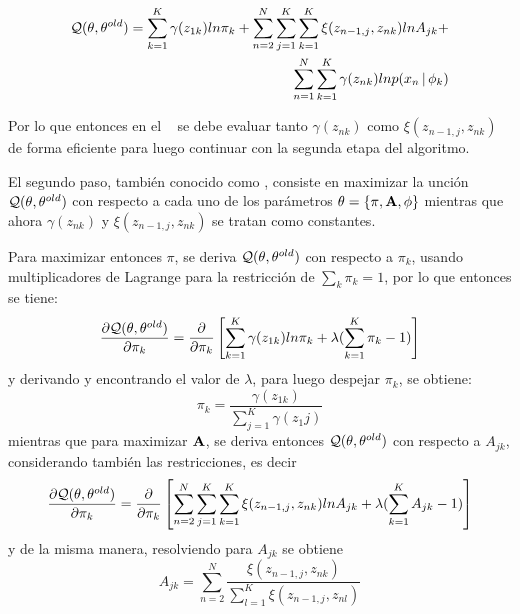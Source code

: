 \begin{equation}
\begin{split}
\mathcal{Q}(\theta, \theta^{old}) = 
  \sum_{k=1}^K \gamma(z_{1k}) ln \pi_k + 
  \sum_{n=2}^N \sum_{j=1}^K \sum_{k=1}^K \xi(z_{n-1,j}, z_{nk}) ln A_{jk} + \\
  \sum_{n=1}^N \sum_{k=1}^K \gamma(z_{nk}) ln p(x_n \,|\, \phi_k)
\label{eqn:3-7}
\end{split}
\end{equation}

Por lo que entonces en el \estep~ se debe evaluar tanto $\gamma(z_{nk})$ como $\xi(z_{n-1,j}, z_{nk})$ de forma eficiente para luego continuar con la segunda etapa del algoritmo.

El segundo paso, también conocido como \mstep, consiste en maximizar la unción $\mathcal{Q}(\theta, \theta^{old})$ con respecto a cada uno de los parámetros $\theta = \lbrace \pi, \textbf{A}, \phi \rbrace$ mientras que ahora $\gamma(z_{nk})$ y $\xi(z_{n-1,j}, z_{nk})$ se tratan como constantes.

Para maximizar entonces $\pi$, se deriva $\mathcal{Q}(\theta, \theta^{old})$ con respecto a $\pi_k$, usando multiplicadores de Lagrange para la restricción de $\sum_k \pi_k = 1$, por lo que entonces se tiene: 
\begin{equation*}
  \frac {\partial \mathcal{Q}(\theta, \theta^{old})}{\partial \pi_k} = 
  \frac {\partial}{\partial \pi_k} 
  \left[
    \sum_{k=1}^K \gamma(z_{1k}) ln \pi_k + \lambda (\sum_{k=1}^K \pi_k - 1) 
  \right]
\end{equation*}
y derivando y encontrando el valor de $\lambda$, para luego despejar $\pi_k$, se obtiene:
\begin{equation}
  \pi_k = \frac{\gamma(z_{1k})}{\sum_{j=1}^K \gamma(z_1j)}
\label{eqn:3-8}
\end{equation}
mientras que para maximizar $\textbf{A}$, se deriva entonces $\mathcal{Q}(\theta, \theta^{old})$ con respecto a $A_{jk}$, considerando también las restricciones, es decir
\begin{equation*}
  \frac {\partial \mathcal{Q}(\theta, \theta^{old})}{\partial \pi_k} = 
  \frac {\partial}{\partial \pi_k} 
  \left[
    \sum_{n=2}^N \sum_{j=1}^K \sum_{k=1}^K \xi(z_{n-1,j}, z_{nk}) ln A_{jk} 
    + \lambda (\sum_{k=1}^K A_{jk} - 1) 
  \right]
\end{equation*}
y de la misma manera, resolviendo para $A_{jk}$ se obtiene
\begin{equation}
A_{jk} = \sum_{n=2}^N 
  \frac{\xi(z_{n-1,j}, z_{nk})}
  {\sum_{l=1}^K \xi(z_{n-1,j}, z_{nl})}
\label{eqn:3-9}
\end{equation}

